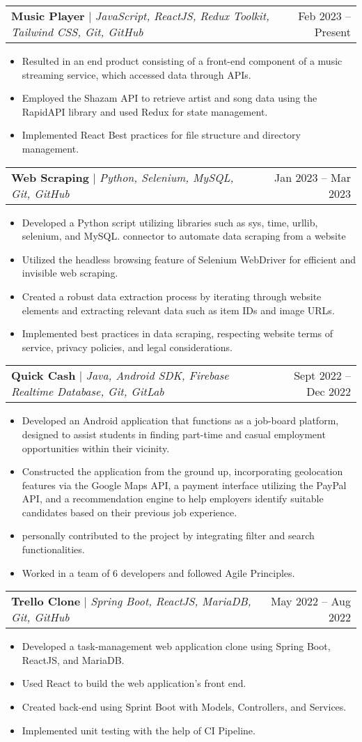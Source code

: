 \documentclass[letterpaper,11pt]{article}
\makeatletter
\newcommand{\resumeItem}[1]{
  \item\small{
    {#1 \vspace{-2pt}}
  }
}
\newcommand{\resumeProjectHeading}[2]{
    \item
    \begin{tabular*}{0.97\textwidth}{l@{\extracolsep{\fill}}r}
      \small#1 & #2 \\
    \end{tabular*}\vspace{-7pt}
}
\newcommand{\resumeItemListStart}{\begin{itemize}}
\newcommand{\resumeItemListEnd}{\end{itemize}\vspace{-5pt}}
\makeatother
\begin{document}
      \resumeProjectHeading
          {\textbf{Music Player} $|$ \emph{JavaScript, ReactJS, Redux Toolkit, Tailwind CSS, Git, GitHub}}{Feb 2023 -- Present}
          \resumeItemListStart
            \resumeItem{Resulted in an end product consisting of a front-end component of a music streaming service, which accessed data through APIs.}
            \resumeItem{Employed the Shazam API to retrieve artist and song data using the RapidAPI library and used Redux for state management.}
            \resumeItem{Implemented React Best practices for file structure and directory management.}
          \resumeItemListEnd

      \resumeProjectHeading
        {\textbf{Web Scraping} $|$ \emph{Python, Selenium, MySQL, Git, GitHub}}{Jan 2023 -- Mar 2023}
        \resumeItemListStart
            \resumeItem{Developed a Python script utilizing libraries such as sys, time, urllib, selenium, and MySQL. connector to automate data scraping from a website}
            \resumeItem{Utilized the headless browsing feature of Selenium WebDriver for efficient and invisible web scraping.}
            \resumeItem{Created a robust data extraction process by iterating through website elements and extracting relevant data such as item IDs and image URLs.}
            \resumeItem{Implemented best practices in data scraping, respecting website terms of service, privacy policies, and legal considerations.}
        \resumeItemListEnd
        
      \resumeProjectHeading
          {\textbf{Quick Cash} $|$ \emph{Java, Android SDK, Firebase Realtime Database, Git, GitLab}}{Sept 2022 -- Dec 2022}
          \resumeItemListStart
            \resumeItem{Developed an Android application that functions as a job-board platform, designed to assist students in finding part-time and casual employment opportunities within their vicinity.}
            \resumeItem{Constructed the application from the ground up, incorporating geolocation features via the Google Maps API, a payment interface utilizing the PayPal API, and a recommendation engine to help employers identify suitable candidates based on their previous job experience.}
            \resumeItem{personally contributed to the project by integrating filter and search functionalities.}
            \resumeItem{Worked in a team of 6 developers and followed Agile Principles.}
          \resumeItemListEnd
      
      \resumeProjectHeading
          {\textbf{Trello Clone} $|$ \emph{Spring Boot, ReactJS, MariaDB, Git, GitHub}}{May 2022 -- Aug 2022}
          \resumeItemListStart
            \resumeItem{Developed a task-management web application clone using Spring Boot, ReactJS, and MariaDB.}
            \resumeItem{Used React to build the web application's front end.}
            \resumeItem{Created back-end using Sprint Boot with Models, Controllers, and Services.}
            \resumeItem{Implemented unit testing with the help of CI Pipeline.}
          \resumeItemListEnd
\end{document}

